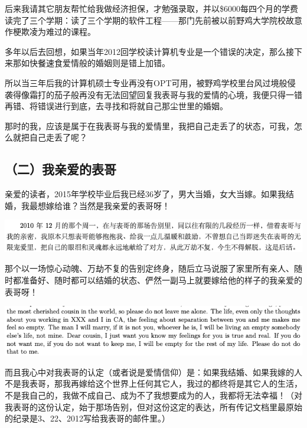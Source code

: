 \documentclass[9pt, b5paper]{article}
\begin{document}
后来我请其它朋友帮忙给我做经济担保，才勉强录取，并以\$6000每四个月的学费读完了三个学期：读了三个学期的软件工程——那门先前被以前野鸡大学院校故意作梗欺凌为难过的课程。

多年以后去回想，如果当年2012回学校读计算机专业是一个错误的决定，那么接下来那如快餐速食爱情般的婚姻则是错上加错。

所以当三年后我的计算机硕士专业再没有OPT可用，被野鸡学校里台风过境般侵袭得像霜打的茄子般再没有无法回望回复我表哥与我的爱情的心境，我便只得一错再错、将错误进行到底，去寻找和将就自己那尘世里的婚姻。

那时的我，应该是属于在我表哥与我的爱情里，我把自己走丢了的状态，可我，怎么就把自己走丢了呢？

\subsection{（二）我亲爱的表哥}
\label{sec:orgb842756}

亲爱的读者，2015年学校毕业后我已经36岁了，男大当婚，女大当嫁。如果我结婚，我最想嫁给谁？当然是我亲爱的表哥呀！

\begin{center}
\includegraphics[width=.9\linewidth]{./pic/backups_plans_20210426_112346.png}
\end{center}

那个以一场惊心动魄、万劫不复的告别定终身，随后立马说服了家里所有亲人、随时都准备好、随时都可以结婚的状态、俨然一副马上就要嫁给他的样子的我亲爱的表哥呀！

\begin{center}
\includegraphics[width=.9\linewidth]{./pic/backups_plans_20210423_201706.png}
\end{center}

而且我心中对我表哥的认定（或者说是爱情信仰）是：如果我结婚、如果我嫁的人不是我表哥，那我再嫁给这个世界上任何其它人，我过的都终将是其它人的生活，不是我自己的，我做不成自己、成为不了我想要成为的人，我都将无法幸福！（对我表哥的这份认定，始于那场告别，但对这份这定的表达，所有传记文档里最原始的纪录是3、22、2012写给我表哥的邮件里。）
\end{document}
